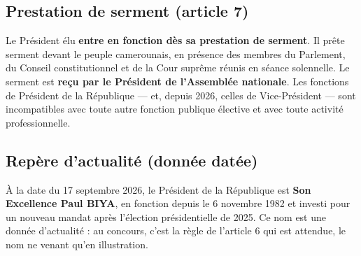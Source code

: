 \documentclass[11pt,a4paper,oneside]{report}
\begin{document}
\subsection{Prestation de serment (article 7)}
Le Président élu \textbf{entre en fonction dès sa prestation de serment}. Il prête serment devant le peuple camerounais, en présence des membres du Parlement, du Conseil constitutionnel et de la Cour suprême réunis en séance solennelle. Le serment est \textbf{reçu par le Président de l'Assemblée nationale}. Les fonctions de Président de la République — et, depuis 2026, celles de Vice-Président — sont incompatibles avec toute autre fonction publique élective et avec toute activité professionnelle.

\subsection{Repère d'actualité (donnée datée)}
À la date du 17 septembre 2026, le Président de la République est \textbf{Son Excellence Paul BIYA}, en fonction depuis le 6 novembre 1982 et investi pour un nouveau mandat après l'élection présidentielle de 2025. Ce nom est une donnée d'actualité : au concours, c'est la règle de l'article 6 qui est attendue, le nom ne venant qu'en illustration.
\end{document}
